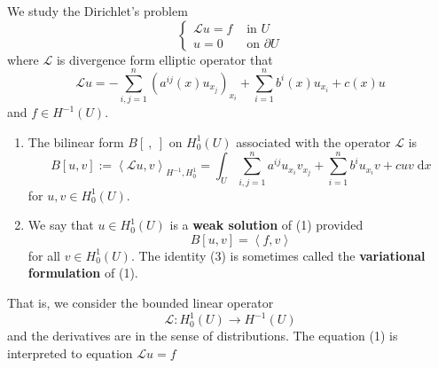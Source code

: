 \begin{definition}
    We study the Dirichlet's problem
    \begin{equation*}
        \left\{\begin{aligned}
            \mathcal{L}u=f & \text { in } U          \\
            u=0            & \text { on } \partial U
        \end{aligned}\right. \tag{1}
    \end{equation*}
    where $\mathcal{L}$ is divergence form elliptic operator that
    \begin{equation*}
        \mathcal{L}u
        =
        -\sum_{i, j=1}^n\left(a^{i j}(x) u_{x_j}\right)_{x_i} + \sum_{i=1}^n b^i(x) u_{x_i}+c(x) u
    \end{equation*}
    and $f\in H^{-1}\left(U\right)$.

    \begin{enumerate}
        \item
              The bilinear form $B[\ , \ ]$ on $H^1_0\left(U\right)$ associated with the operator $\mathcal{L}$ is
              \begin{equation*}
                  B[u, v]
                  :=
                  \left\langle \mathcal{L}u,v \right\rangle_{H^{-1},H^1_0}
                  =
                  \int_U \sum_{i, j=1}^n a^{i j} u_{x_i} v_{x_j}+\sum_{i=1}^n b^i u_{x_i} v+c u v \; \mathrm{d} x
              \end{equation*}
              for $u, v \in H_0^1(U)$.

        \item  We say that $u \in H_0^1(U)$ is a \textbf{weak solution} of (1) provided
              \begin{equation*}
                  B\left[u, v\right]
                  =
                  \left\langle f,v \right\rangle
              \end{equation*}
              for all $v \in H_0^1(U)$.
              The identity (3) is sometimes called the \textbf{variational formulation} of (1).
    \end{enumerate}
    \begin{remark}
        That is, we consider the bounded linear operator
        \begin{equation*}
            \mathcal{L}: H_0^1(U) \rightarrow H^{-1}(U)
        \end{equation*}
        and the derivatives are in the sense of distributions.
        The equation (1) is interpreted to equation $\mathcal{L}u=f$
    \end{remark}
\end{definition}



